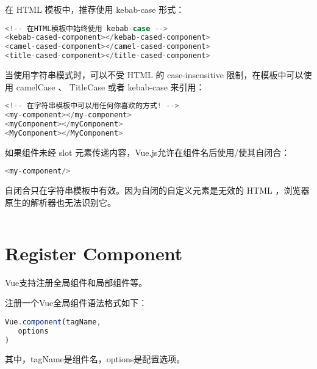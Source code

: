 \begin{compactitem}
\item 在 HTML 模板中，推荐使用 kebab-case 形式：

\begin{lstlisting}[language=JavaScript]
<!-- 在HTML模板中始终使用 kebab-case -->
<kebab-cased-component></kebab-cased-component>
<camel-cased-component></camel-cased-component>
<title-cased-component></title-cased-component>
\end{lstlisting}

\item 当使用字符串模式时，可以不受 HTML 的 case-insensitive 限制，在模板中可以使用 camelCase 、 TitleCase 或者 kebab-case 来引用：

\begin{lstlisting}[language=JavaScript]
<!-- 在字符串模板中可以用任何你喜欢的方式! -->
<my-component></my-component>
<myComponent></myComponent>
<MyComponent></MyComponent>
\end{lstlisting}

\end{compactitem}

如果组件未经 slot 元素传递内容，Vue.js允许在组件名后使用/使其自闭合：



\begin{lstlisting}[language=JavaScript]
<my-component/>
\end{lstlisting}

自闭合只在字符串模板中有效。因为自闭的自定义元素是无效的 HTML ，浏览器原生的解析器也无法识别它。

\begin{lstlisting}[language=JavaScript]

\end{lstlisting}

\section{Register Component}

Vue支持注册全局组件和局部组件等。

注册一个Vue全局组件语法格式如下：




\begin{lstlisting}[language=JavaScript]
Vue.component(tagName,
   options
)
\end{lstlisting}

其中，tagName是组件名，options是配置选项。

